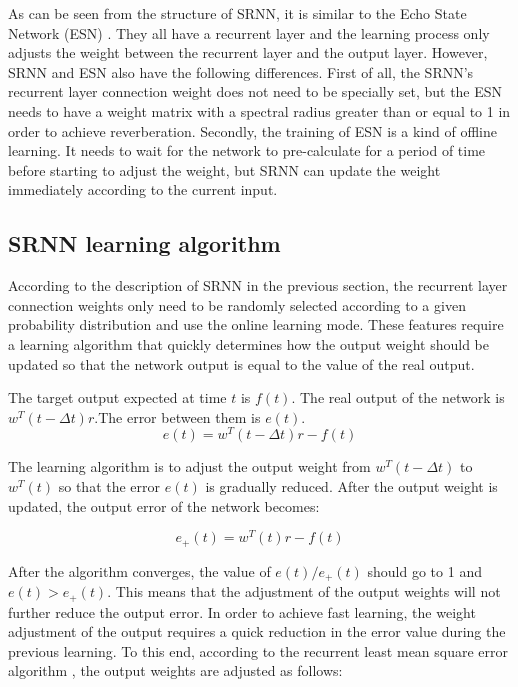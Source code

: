 \documentclass[runningheads]{llncs}
\begin{document}
As can be seen from the structure of SRNN, it is similar to the Echo 
State Network (ESN) \cite{RN22}.
They all have a recurrent layer and the learning process only adjusts 
the weight between the recurrent layer and the output layer. However, 
SRNN and ESN also have the following differences. First of all, 
the SRNN's recurrent layer connection weight does not need to be 
specially set, but the ESN needs to have a weight matrix with a 
spectral radius greater than or equal to 1 in order to achieve reverberation.
Secondly, the training of ESN is a kind of offline learning. It needs to wait 
for the network to pre-calculate for a period of time before starting to
adjust the weight, but SRNN can update the weight immediately according 
to the current input.

\subsection{SRNN learning algorithm}
According to the description of SRNN in the previous section, 
the recurrent layer connection weights only need to be randomly 
selected according to a given probability distribution and use the 
online learning mode. These features require a learning algorithm 
that quickly determines how the output weight should be 
updated so that the network output is equal to the value of the 
real output.

The target output expected at time $t$ is $f(t)$. The real 
output of the network is $w^T (t-\Delta t) r$.The error between them is $e(t)$.
\begin{equation}
e(t)= w^T (t -\Delta t)r-f(t)
\end{equation}

The learning algorithm is to adjust the output weight 
from $w^T (t -\Delta t)$ to $w^T (t)$ so that the error $e(t)$ is gradually reduced.
After the output weight is updated, the output error of the network becomes:

\begin{equation}
e_+(t)= w^T (t)r-f(t)
\end{equation}

After the algorithm converges, the value of $e(t)/e_+ (t)$ should go to 1 and $e(t)>e_+(t)$.
This means that the adjustment of the output weights will not further 
reduce the output error. In order to achieve fast learning,
the weight adjustment of the output requires a quick reduction 
in the error value during the previous learning. To this end, 
according to the recurrent least mean square error algorithm \cite{RN23}, 
the output weights are adjusted as follows:
\end{document}
